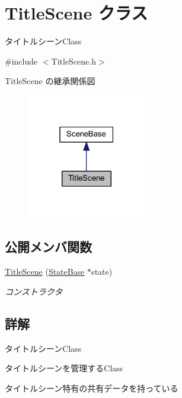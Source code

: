 \hypertarget{class_title_scene}{}\section{Title\+Scene クラス}
\label{class_title_scene}


タイトルシーン\+Class  




{\ttfamily \#include $<$Title\+Scene.\+h$>$}



Title\+Scene の継承関係図\nopagebreak
\begin{figure}[H]
\begin{center}
\leavevmode
\includegraphics[width=147pt]{class_title_scene__inherit__graph}
\end{center}
\end{figure}
\subsection*{公開メンバ関数}
\begin{DoxyCompactItemize}
\item 
\mbox{\hyperlink{class_title_scene_a433ef854689b1c9defb29d9f999c52da}{Title\+Scene}} (\mbox{\hyperlink{class_scene_base_1_1_state_base}{State\+Base}} $\ast$state)
\begin{DoxyCompactList}\small\item\em コンストラクタ \end{DoxyCompactList}\end{DoxyCompactItemize}


\subsection{詳解}
タイトルシーン\+Class 

タイトルシーンを管理する\+Class

タイトルシーン特有の共有データを持っている 

